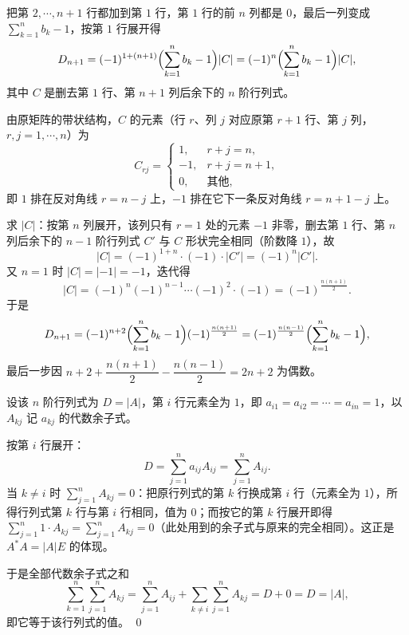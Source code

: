 \begin{solution}
把第 $2,\cdots,n+1$ 行都加到第 $1$ 行，第 $1$ 行的前 $n$ 列都是 $0$，最后一列变成 $\sum\limits_{k=1}^{n}b_k-1$，按第 $1$ 行展开得
\[
D_{n+1}=(-1)^{1+(n+1)}\Bigl(\sum_{k=1}^{n}b_k-1\Bigr)|C|=(-1)^{n}\Bigl(\sum_{k=1}^{n}b_k-1\Bigr)|C|,
\]
其中 $C$ 是删去第 $1$ 行、第 $n+1$ 列后余下的 $n$ 阶行列式。

由原矩阵的带状结构，$C$ 的元素（行 $r$、列 $j$ 对应原第 $r+1$ 行、第 $j$ 列，$r,j=1,\cdots,n$）为
\[
C_{rj}=\begin{cases}1,&r+j=n,\\ -1,&r+j=n+1,\\ 0,&\text{其他},\end{cases}
\]
即 $1$ 排在反对角线 $r=n-j$ 上，$-1$ 排在它下一条反对角线 $r=n+1-j$ 上。

求 $|C|$：按第 $n$ 列展开，该列只有 $r=1$ 处的元素 $-1$ 非零，删去第 $1$ 行、第 $n$ 列后余下的 $n-1$ 阶行列式 $C'$ 与 $C$ 形状完全相同（阶数降 $1$），故
\[
|C|=(-1)^{1+n}\cdot(-1)\cdot|C'|=(-1)^{n}|C'| .
\]
又 $n=1$ 时 $|C|=|-1|=-1$，迭代得
\[
|C|=(-1)^{n}(-1)^{n-1}\cdots(-1)^{2}\cdot(-1)=(-1)^{\frac{n(n+1)}{2}} .
\]
于是
\[
D_{n+1}=(-1)^{n+2}\Bigl(\sum_{k=1}^{n}b_k-1\Bigr)(-1)^{\frac{n(n+1)}{2}}
=(-1)^{\frac{n(n-1)}{2}}\Bigl(\sum_{k=1}^{n}b_k-1\Bigr),
\]
最后一步因 $n+2+\dfrac{n(n+1)}{2}-\dfrac{n(n-1)}{2}=2n+2$ 为偶数。
\end{solution}

\begin{solution}
设该 $n$ 阶行列式为 $D=|A|$，第 $i$ 行元素全为 $1$，即 $a_{i1}=a_{i2}=\cdots=a_{in}=1$，以 $A_{kj}$ 记 $a_{kj}$ 的代数余子式。

按第 $i$ 行展开：
\[
D=\sum_{j=1}^{n}a_{ij}A_{ij}=\sum_{j=1}^{n}A_{ij}.
\]
当 $k\ne i$ 时 $\sum\limits_{j=1}^{n}A_{kj}=0$：把原行列式的第 $k$ 行换成第 $i$ 行（元素全为 $1$），所得行列式第 $k$ 行与第 $i$ 行相同，值为 $0$；而按它的第 $k$ 行展开即得 $\sum\limits_{j=1}^{n}1\cdot A_{kj}=\sum\limits_{j=1}^{n}A_{kj}=0$（此处用到的余子式与原来的完全相同）。这正是 $A^{*}A=|A|E$ 的体现。

于是全部代数余子式之和
\[
\sum_{k=1}^{n}\sum_{j=1}^{n}A_{kj}
=\sum_{j=1}^{n}A_{ij}+\sum_{k\ne i}\sum_{j=1}^{n}A_{kj}
=D+0=D=|A|,
\]
即它等于该行列式的值。
\qed
\end{solution}
